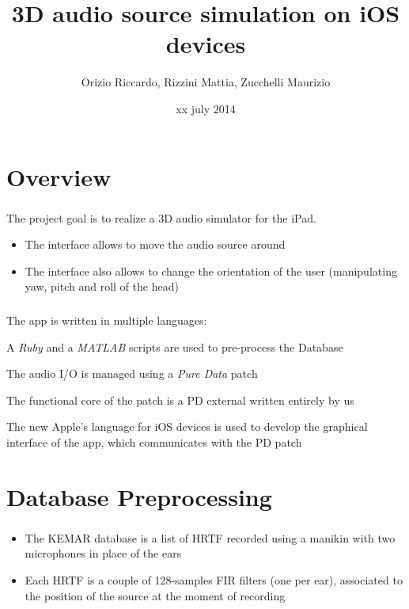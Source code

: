 \documentclass{beamer}
\title{3D audio source simulation on iOS devices}
\author[Orizio, Rizzini, Zucchelli]{Orizio Riccardo, Rizzini Mattia, Zucchelli Maurizio}
\date{xx july 2014}
\institute[UniBS]{University of Brescia}
\begin{document}
	\begin{frame}
		\maketitle
	\end{frame}

	\section{Overview}
	
	\begin{frame}
		\frametitle{\insertsection}
		The project goal is to realize a 3D audio simulator for the iPad.
		\begin{itemize}
			\item The interface allows to move the audio source around
			\item The interface also allows to change the orientation of the user (manipulating yaw,
				pitch and roll of the head)
		\end{itemize}
	\end{frame}

	\begin{frame}
		\frametitle{\insertsection}
		The app is written in multiple languages:
		\begin{description}[leftmargin=1em]
			\item[Ruby, MATLAB] A {\em Ruby} and a {\em MATLAB} scripts are
				used to pre-process the Database
			\item[Pure Data] The audio I/O is managed using a {\em Pure Data} patch
			\item[C++] The functional core of the patch is a PD external written entirely
				by us
			\item[Swift] The new Apple's language for iOS devices is used to develop the
				graphical interface of the app, which communicates with the PD patch
		\end{description}
	\end{frame}

	\AtBeginSection[]
	{
		\begin{frame}
			\frametitle{Outline}
			\tableofcontents[currentsection]
		\end{frame}
	}

	\section{Database Preprocessing}

	\begin{frame}
		\frametitle{\insertsection}
		\begin{itemize}
			\item The \textsc{KEMAR} database is a list of \textsc{HRTF} recorded using a manikin with two
				microphones in place of the ears
			\item Each \textsc{HRTF} is a couple of 128-samples FIR filters (one per ear), associated to the position
				of the source at the moment of recording
		\end{itemize}
	\end{frame}
\end{document}
